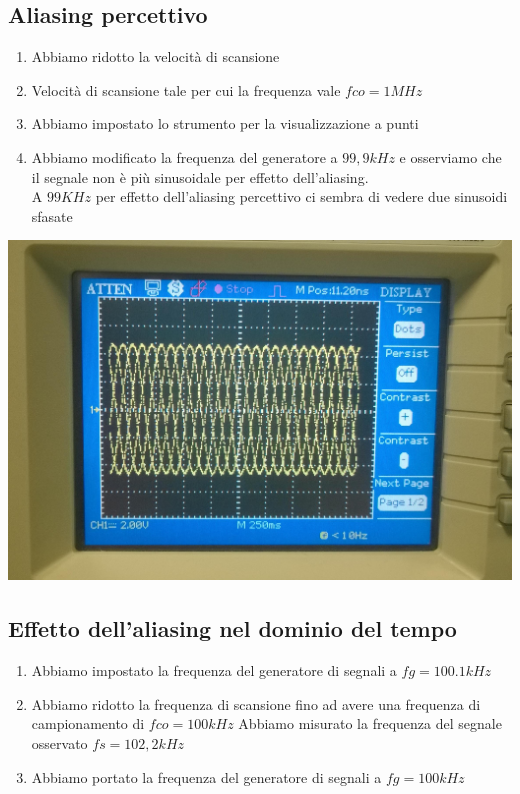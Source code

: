 \documentclass[a4paper]{article}
\begin{document}
\subsection{Aliasing percettivo}
 \begin{enumerate}
  \item Abbiamo ridotto la velocità di scansione
  \item Velocità di scansione tale per cui la frequenza vale \(fco= 1 MHz\)
  \item Abbiamo impostato lo strumento per la visualizzazione a punti
  \item Abbiamo modificato la frequenza del generatore a \(99,9 kHz\) e osserviamo che il segnale non è più sinusoidale per effetto dell'aliasing. \\ A \(99 KHz\) per effetto dell'aliasing percettivo ci sembra di vedere due sinusoidi sfasate 
 \end{enumerate}

\begin{center}
    \includegraphics[scale=0.13]{foto/WP_20141009_023.jpg}
\end{center}


\subsection{Effetto dell’aliasing nel dominio del tempo}
 \begin{enumerate}
  \item Abbiamo impostato la frequenza del generatore di segnali a \(fg=100.1 kHz\)
  \item Abbiamo ridotto la frequenza di scansione fino ad avere una frequenza di campionamento di \(fco=100 kHz\) Abbiamo misurato la frequenza del segnale osservato \(fs= 102,2 kHz\)
  \item Abbiamo portato la frequenza del generatore di segnali a \(fg=100kHz\)
\end{enumerate}
\end{document}
